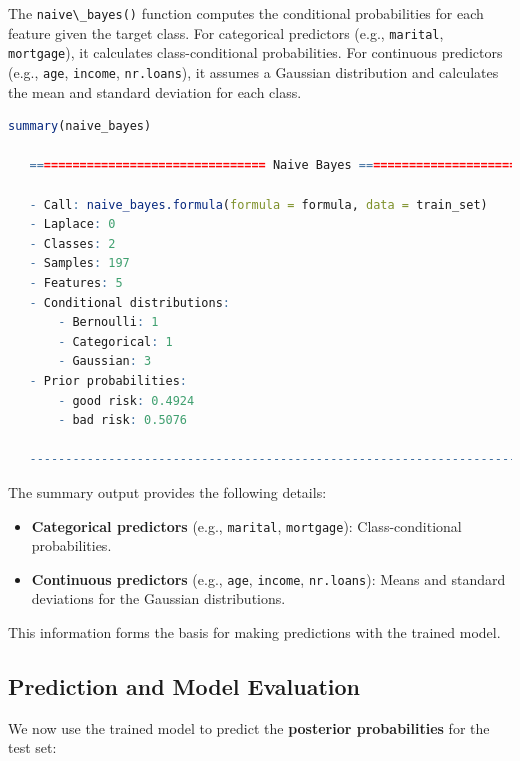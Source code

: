\documentclass[
]{book}
\newcommand{\passthrough}[1]{#1}
\providecommand{\tightlist}{%
  \setlength{\itemsep}{0pt}\setlength{\parskip}{0pt}}
\theoremstyle{definition}
\theoremstyle{definition}
\theoremstyle{definition}
\theoremstyle{definition}
\theoremstyle{remark}
\begin{document}
The \passthrough{\lstinline!naive\_bayes()!} function computes the conditional probabilities for each feature given the target class. For categorical predictors (e.g., \passthrough{\lstinline!marital!}, \passthrough{\lstinline!mortgage!}), it calculates class-conditional probabilities. For continuous predictors (e.g., \passthrough{\lstinline!age!}, \passthrough{\lstinline!income!}, \passthrough{\lstinline!nr.loans!}), it assumes a Gaussian distribution and calculates the mean and standard deviation for each class.

\begin{lstlisting}[language=R]
summary(naive_bayes)
   
   ================================= Naive Bayes ================================== 
    
   - Call: naive_bayes.formula(formula = formula, data = train_set) 
   - Laplace: 0 
   - Classes: 2 
   - Samples: 197 
   - Features: 5 
   - Conditional distributions: 
       - Bernoulli: 1
       - Categorical: 1
       - Gaussian: 3
   - Prior probabilities: 
       - good risk: 0.4924
       - bad risk: 0.5076
   
   --------------------------------------------------------------------------------
\end{lstlisting}

The summary output provides the following details:

\begin{itemize}
\tightlist
\item
  \textbf{Categorical predictors} (e.g., \passthrough{\lstinline!marital!}, \passthrough{\lstinline!mortgage!}): Class-conditional probabilities.\\
\item
  \textbf{Continuous predictors} (e.g., \passthrough{\lstinline!age!}, \passthrough{\lstinline!income!}, \passthrough{\lstinline!nr.loans!}): Means and standard deviations for the Gaussian distributions.
\end{itemize}

This information forms the basis for making predictions with the trained model.

\subsection*{Prediction and Model Evaluation}\label{prediction-and-model-evaluation}

We now use the trained model to predict the \textbf{posterior probabilities} for the test set:
\end{document}
